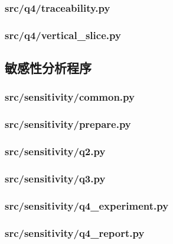 \documentclass[zihao=-4,a4paper,UTF8,fontset=none]{ctexart}
\begin{document}
\subsubsection*{src/q4/traceability.py}


\subsubsection*{src/q4/vertical\_slice.py}


\subsection{敏感性分析程序}
\subsubsection*{src/sensitivity/common.py}


\subsubsection*{src/sensitivity/prepare.py}


\subsubsection*{src/sensitivity/q2.py}


\subsubsection*{src/sensitivity/q3.py}


\subsubsection*{src/sensitivity/q4\_experiment.py}


\subsubsection*{src/sensitivity/q4\_report.py}

\end{document}
